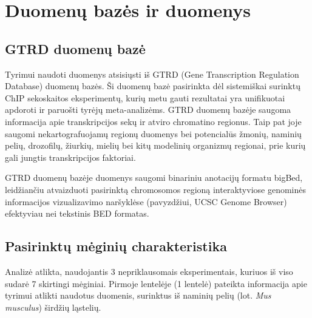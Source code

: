 \documentclass[12pt]{article}
\begin{document}
\newpage


\section{Duomenų bazės ir duomenys}
\subsection{GTRD duomenų bazė}
Tyrimui naudoti duomenys atsisiųsti iš GTRD (Gene Transcription Regulation
Database)\cite{GTRD} duomenų bazės. Ši duomenų bazė pasirinkta dėl sistemiškai
surinktų ChIP sekoskaitos eksperimentų, kurių metu gauti rezultatai yra
unifikuotai apdoroti ir paruošti tyrėjų meta-analizėms. GTRD duomenų bazėje
saugoma informacija apie transkripcijos sekų ir atviro chromatino regionus.
Taip pat joje saugomi nekartografuojamų regionų duomenys bei potencialūs
žmonių, naminių pelių, drozofilų, žiurkių, mielių bei kitų modelinių
organizmų regionai, prie kurių gali jungtis transkripcijos faktoriai.

GTRD duomenų bazėje duomenys saugomi binariniu anotacijų formatu bigBed,
leidžiančiu atvaizduoti pasirinktą chromosomos regioną interaktyviose genominės
informacijos vizualizavimo naršyklėse (pavyzdžiui, UCSC Genome
Browser\cite{UCSCGB}) efektyviau nei tekstinis BED formatas.

\subsection{Pasirinktų mėginių charakteristika}
Analizė atlikta, naudojantis 3 nepriklausomais eksperimentais, kuriuos iš viso
sudarė 7 skirtingi mėginiai. Pirmoje lentelėje (1 lentelė) pateikta informacija
apie tyrimui atlikti naudotus duomenis, surinktus iš naminių pelių
(lot. \emph{Mus musculus}) širdžių ląstelių.
\end{document}
